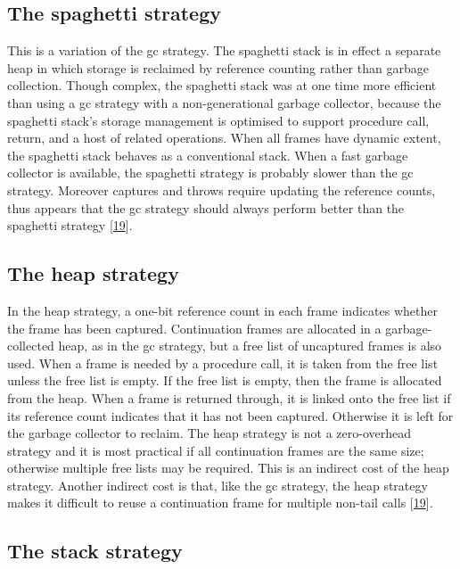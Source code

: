 \documentclass[12pt,a4paper,oneside,openright]{book}
\begin{document}
\subsection{The spaghetti strategy}\label{the-spaghetti-strategy}

This is a variation of the gc strategy. The spaghetti stack is in effect
a separate heap in which storage is reclaimed by reference counting
rather than garbage collection. Though complex, the spaghetti stack was
at one time more efficient than using a gc strategy with a
non-generational garbage collector, because the spaghetti stack's
storage management is optimised to support procedure call, return, and a
host of related operations. When all frames have dynamic extent, the
spaghetti stack behaves as a conventional stack. When a fast garbage
collector is available, the spaghetti strategy is probably slower than
the gc strategy. Moreover captures and throws require updating the
reference counts, thus appears that the gc strategy should always
perform better than the spaghetti strategy
{[}\hyperref[ref-Clinger1999]{19}{]}.

\subsection{The heap strategy}\label{the-heap-strategy}

In the heap strategy, a one-bit reference count in each frame indicates
whether the frame has been captured. Continuation frames are allocated
in a garbage-collected heap, as in the gc strategy, but a free list of
uncaptured frames is also used. When a frame is needed by a procedure
call, it is taken from the free list unless the free list is empty. If
the free list is empty, then the frame is allocated from the heap. When
a frame is returned through, it is linked onto the free list if its
reference count indicates that it has not been captured. Otherwise it is
left for the garbage collector to reclaim. The heap strategy is not a
zero-overhead strategy and it is most practical if all continuation
frames are the same size; otherwise multiple free lists may be required.
This is an indirect cost of the heap strategy. Another indirect cost is
that, like the gc strategy, the heap strategy makes it difficult to
reuse a continuation frame for multiple non-tail calls
{[}\hyperref[ref-Clinger1999]{19}{]}.

\subsection{The stack strategy}\label{the-stack-strategy}
\end{document}
